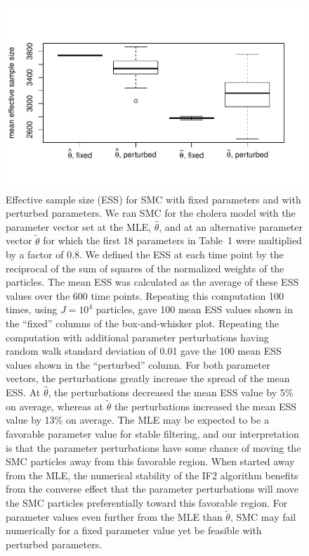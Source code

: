 \documentclass[11pt]{article}
\newcommand\reviewerVersion[2]{#1} %
\begin{document}
\begin{figure}


\begin{center}


\reviewerVersion{
\vspace{-20mm}

\includegraphics{figS3}

\vspace{-20mm}

}{\medskip\texttt{Figure pdf in figS3.pdf. For review, please view supp-if2-review.pdf.}}


\end{center}
\caption{Effective sample size (ESS) for SMC with fixed parameters and with perturbed parameters. 
We ran SMC for the cholera model with the parameter vector set at the MLE, $\hat\theta$, and at an alternative parameter vector $\tilde \theta$ for which the first 18 parameters in Table~1 were multiplied by a factor of 0.8. 
We defined the ESS at each time point by the reciprocal of the sum of squares of the normalized weights of the particles. The mean ESS was calculated as the average of these ESS values over the 600 time points. Repeating this computation 100 times, using $J=10^4$ particles, gave 100 mean ESS values shown in the ``fixed'' columns of the box-and-whisker plot. Repeating the computation with additional parameter perturbations having random walk standard deviation of 0.01 gave the 100 mean ESS values shown in the ``perturbed'' column. 
For both parameter vectors, the perturbations greatly increase the spread of the mean ESS.
At $\hat\theta$, the perturbations decreased the mean ESS value by 5\% on average, whereas at $\tilde\theta$ the perturbations increased the mean ESS value by 13\% on average.
The MLE may be expected to be a favorable parameter value for stable filtering, and our interpretation is that the parameter perturbations have some chance of moving the SMC particles away from this favorable region.
When started away from the MLE, the numerical stability of the IF2 algorithm benefits from the converse effect that the parameter perturbations will move the SMC particles preferentially toward this favorable region.
For parameter values even further  from the MLE than $\tilde\theta$, SMC may fail numerically for a fixed parameter value yet be feasible with perturbed parameters.
}\label{fig:ess}
\end{figure}
\end{document}
